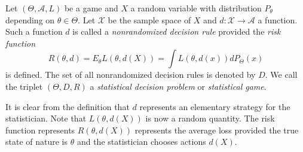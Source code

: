 \begin{definition}
	Let $(\Theta,\mathcal{A},L)$ be a game and $X$ a random variable with distribution $P_\theta$ depending on $\theta\in \Theta$. Let $\mathcal{X}$ be the sample space of $X$ and $d:\mathcal{X}\to \mathcal{A}$ a function. Such a function $d$ is called a \emph{nonrandomized decision rule} provided the \emph{risk function}
	\[R(\theta,d)=E_\theta L(\theta,d(X))=\int L(\theta,d(x))dP_\Theta(x)	\]
	is defined. The set of all nonrandomized decision rules is denoted by $D$. We call the triplet $(\Theta,D,R)$ a \emph{statistical decision problem} or \emph{statistical game}.
\end{definition}
It is clear from the definition that $d$ represents an elementary strategy for the statistician. Note that $L(\theta,d(X))$ is now a random quantity. The risk function represents $R(\theta,d(X))$ represents the average loss provided the true state of nature is $\theta$ and the statistician chooses actions $d(X)$.
%


